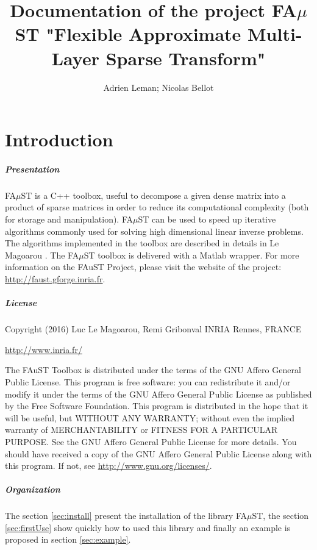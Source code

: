 \documentclass[a4paper,11pt]{report}
\author{Adrien Leman; Nicolas Bellot}
\title{Documentation of the project FA$\mu$ST \smallbreak "Flexible Approximate Multi-Layer Sparse Transform"}
\begin{document}
\maketitle

\tableofcontents

\newpage

\chapter{Introduction}\label{sec:intro}

\paragraph{Presentation} FA$\mu$ST is a C++ toolbox, useful to decompose a given dense matrix into a product of sparse matrices in order to reduce its computational complexity (both for storage and manipulation). 
FA$\mu$ST can be used to speed up iterative algorithms commonly used for solving high dimensional linear inverse problems. The algorithms implemented in the toolbox are described in details in Le Magoarou \cite{LeMagoarou2016}.
The FA$\mu$ST toolbox is delivered with a Matlab wrapper. 
For more information on the FAuST Project, please visit the website of the project: \url{http://faust.gforge.inria.fr}.

\paragraph{License} 
Copyright (2016) Luc Le Magoarou, Remi Gribonval INRIA Rennes, FRANCE 
\begin{center} 
\url{http://www.inria.fr/}
\end{center}

The FAuST Toolbox is distributed under the terms of the GNU Affero General Public License. This program is free software: you can redistribute it and/or modify it under the terms of the GNU Affero General Public License as published by the Free Software Foundation. This program is distributed in the hope that it will be useful, but WITHOUT ANY WARRANTY; without even the implied warranty of MERCHANTABILITY or FITNESS FOR A PARTICULAR PURPOSE.  See the GNU Affero General Public License for more details. You should have received a copy of the GNU Affero General Public License along with this program.  If not, see \url{http://www.gnu.org/licenses/}.


\paragraph{Organization} The section \ref{sec:install} present the installation of the library FA$\mu$ST, the section \ref{sec:firstUse} show quickly how to used this library and finally an example is proposed in section \ref{sec:example}. 











\end{document}
